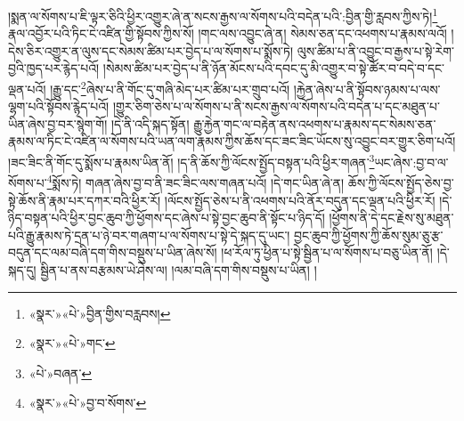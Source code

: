 །སྨན་ལ་སོགས་པ་ཇི་ལྟར་ཅིའི་ཕྱིར་འགྱུར་ཞེ་ན་སངས་རྒྱས་ལ་སོགས་པའི་བདེན་པའི་:བྱིན་གྱི་རླབས་ཀྱིས་ཏེ།\footnote{«སྣར་»«པེ་»བྱིན་གྱིས་བརླབས།} རྣལ་འབྱོར་པའི་ཏིང་ངེ་འཛིན་གྱི་སྟོབས་ཀྱིས་སོ། །གང་ལས་འབྱུང་ཞེ་ན། སེམས་ཅན་དང་འཕགས་པ་རྣམས་ལའོ། །དེས་ཅིར་འགྱུར་ན་ལུས་དང་སེམས་ཚིམ་པར་བྱེད་པ་ལ་སོགས་པ་སྨོས་ཏེ། ལུས་ཚིམ་པ་ནི་འབྱུང་བ་རྒྱས་པ་སྟེ་རེག་བྱའི་ཁྱད་པར་རྙེད་པའོ། །སེམས་ཚིམ་པར་བྱེད་པ་ནི་ཉོན་མོངས་པའི་དབང་དུ་མི་འགྱུར་བ་སྟེ་ཚོར་བ་བདེ་བ་དང་ལྡན་པའོ། །རྒྱུ་དང་\footnote{«སྣར་»«པེ་»གང་}ཞེས་པ་ནི་གོང་དུ་གཞི་མེད་པར་ཚིམ་པར་གྲུབ་པའོ། །རྐྱེན་ཞེས་པ་ནི་སྟོབས་ཉམས་པ་ལས་ལྷག་པའི་སྟོབས་རྙེད་པའོ། །གྱུར་ཅིག་ཅེས་པ་ལ་སོགས་པ་ནི་སངས་རྒྱས་ལ་སོགས་པའི་བདེན་པ་དང་མཐུན་པ་ཡིན་ཞེས་བྱ་བར་སྙེག་གོ། །དེ་ནི་འདི་སྐད་སྟོན། རྒྱུ་རྐྱེན་གང་ལ་བརྟེན་ནས་འཕགས་པ་རྣམས་དང་སེམས་ཅན་རྣམས་ལ་ཏིང་ངེ་འཛིན་ལ་སོགས་པའི་ཡན་ལག་རྣམས་ཀྱིས་ཆོས་དང་ཟང་ཟིང་ཡོངས་སུ་འབྱུང་བར་གྱུར་ཅིག་པའོ། །ཟང་ཟིང་ནི་གོང་དུ་སྨོས་པ་རྣམས་ཡིན་ནོ། །ད་ནི་ཆོས་ཀྱི་ལོངས་སྤྱོད་བསྟན་པའི་ཕྱིར་གཞན་\footnote{«པེ་»བཞན་}ཡང་ཞེས་:བྱ་བ་ལ་སོགས་པ་\footnote{«སྣར་»«པེ་»བྱ་བ་སོགས་}སྨོས་ཏེ། གཞན་ཞེས་བྱ་བ་ནི་ཟང་ཟིང་ལས་གཞན་པའོ། །དེ་གང་ཡིན་ཞེ་ན། ཆོས་ཀྱི་ལོངས་སྤྱོད་ཅེས་བྱ་སྟེ་ཆོས་ནི་རྣམ་པར་དཀར་བའི་ཕྱིར་རོ། །ལོངས་སྤྱོད་ཅེས་པ་ནི་འཕགས་པའི་ནོར་བདུན་དང་ལྡན་པའི་ཕྱིར་རོ། །དེ་ཉིད་བསྟན་པའི་ཕྱིར་བྱང་ཆུབ་ཀྱི་ཕྱོགས་དང་ཞེས་པ་སྟེ་བྱང་ཆུབ་ནི་སྟོང་པ་ཉིད་དོ། །ཕྱོགས་ནི་དེ་དང་རྗེས་སུ་མཐུན་པའི་རྒྱུ་རྣམས་ཏེ་དྲན་པ་ཉེ་བར་གཞག་པ་ལ་སོགས་པ་སྟེ་དེ་སྐད་དུ་ཡང་། བྱང་ཆུབ་ཀྱི་ཕྱོགས་ཀྱི་ཆོས་སུམ་ཅུ་རྩ་བདུན་དང་ལམ་བཞི་དག་གིས་བསྡུས་པ་ཡིན་ཞེས་སོ། །ཕ་རོལ་ཏུ་ཕྱིན་པ་སྟེ་སྦྱིན་པ་ལ་སོགས་པ་བཅུ་ཡིན་ནོ། །དེ་སྐད་དུ། སྦྱིན་པ་ནས་བརྩམས་ཡེ་ཤེས་ལ། །ལམ་བཞི་དག་གིས་བསྡུས་པ་ཡིན། །
